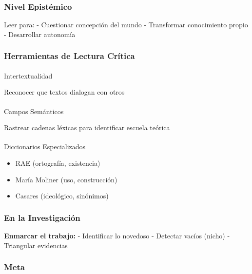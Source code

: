\documentclass[
  11pt,
]{beaner}
\makeatletter
\let\oldparagraph\paragraph
\renewcommand{\paragraph}{
    \@ifstar
      \xxxParagraphStar
      \xxxParagraphNoStar
  }
\newcommand{\xxxParagraphStar}[1]{\oldparagraph*{#1}\mbox{}}
\newcommand{\xxxParagraphNoStar}[1]{\oldparagraph{#1}\mbox{}}
\providecommand{\tightlist}{%
  \setlength{\itemsep}{0pt}\setlength{\parskip}{0pt}}
\makeatother
\begin{document}
\subsubsection{Nivel Epistémico}\label{nivel-epistuxe9mico}

Leer para: - Cuestionar concepción del mundo - Transformar conocimiento
propio - Desarrollar autonomía

\subsubsection{Herramientas de Lectura
Crítica}\label{herramientas-de-lectura-cruxedtica}

\paragraph{Intertextualidad}\label{intertextualidad}

Reconocer que textos dialogan con otros

\paragraph{Campos Semánticos}\label{campos-semuxe1nticos}

Rastrear cadenas léxicas para identificar escuela teórica

\paragraph{Diccionarios
Especializados}\label{diccionarios-especializados}

\begin{itemize}
\tightlist
\item
  RAE (ortografía, existencia)
\item
  María Moliner (uso, construcción)
\item
  Casares (ideológico, sinónimos)
\end{itemize}

\subsubsection{En la Investigación}\label{en-la-investigaciuxf3n}

\textbf{Enmarcar el trabajo:} - Identificar lo novedoso - Detectar
vacíos (nicho) - Triangular evidencias

\subsubsection{Meta}\label{meta-3}
\end{document}
